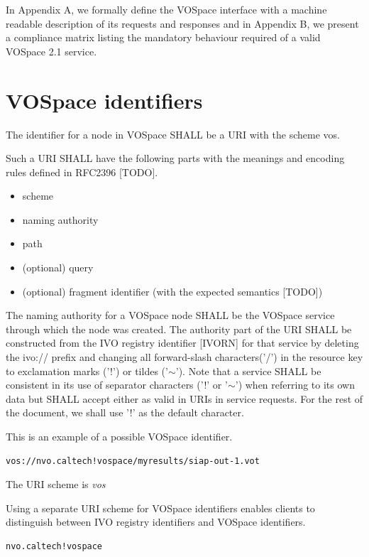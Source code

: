 \documentclass[11pt,a4paper]{ivoa}
\begin{document}
In Appendix A, we formally define the VOSpace interface with a machine readable description of its requests and responses and in Appendix B, we present a compliance matrix listing the mandatory behaviour required of a valid VOSpace 2.1 service.

\section{VOSpace identifiers}
The identifier for a node in VOSpace SHALL be a URI with the scheme vos.

Such a URI SHALL have the following parts with the meanings and encoding rules defined in RFC2396 [TODO].

\begin{itemize}
  \item scheme
  \item naming authority
  \item path
  \item (optional) query
  \item (optional) fragment identifier (with the expected semantics [TODO])
\end{itemize}

The naming authority for a VOSpace node SHALL be the VOSpace service through which the node was created. The authority part of the URI SHALL be constructed from the IVO registry identifier [IVORN] for that service by deleting the ivo:// prefix and changing all forward-slash characters('/') in the resource key to exclamation marks ('!') or tildes ('$\mathtt{\sim}$'). Note that a service SHALL be consistent in its use of separator characters ('!' or '$\mathtt{\sim}$') when referring to its own data but SHALL accept either as valid in URIs in service requests. For the rest of the document, we shall use '!' as the default character.

This is an example of a possible VOSpace identifier.

\begin{verbatim}
vos://nvo.caltech!vospace/myresults/siap-out-1.vot
\end{verbatim}

The URI scheme is \emph{vos}

Using a separate URI scheme for VOSpace identifiers enables clients to distinguish between IVO registry identifiers and VOSpace identifiers.

\begin{verbatim}
nvo.caltech!vospace
\end{verbatim}
\end{document}

